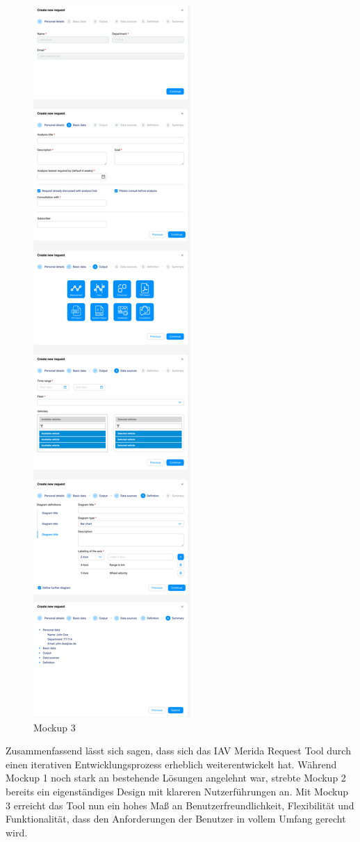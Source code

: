 \begin{figure}[H]
    \centering
    \includegraphics[scale=.25]{media/MockUps3.0}
    \caption{Mockup 3}
    \label{fig:MockUps3.0}
\end{figure}
Zusammenfassend lässt sich sagen, dass sich das IAV Merida Request Tool durch einen iterativen Entwicklungsprozess erheblich weiterentwickelt hat. Während Mockup 1 noch stark an bestehende Lösungen angelehnt war, strebte Mockup 2 bereits ein eigenständiges Design mit klareren Nutzerführungen an. Mit Mockup 3 erreicht das Tool nun ein hohes Maß an Benutzerfreundlichkeit, Flexibilität und Funktionalität, dass den Anforderungen der Benutzer in vollem Umfang gerecht wird.
\newpage
